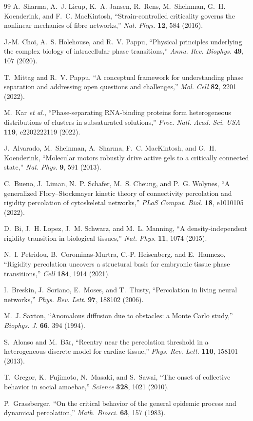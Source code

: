 \documentclass[11pt]{article}
\begin{document}
\begin{thebibliography}{99}
 A.~Sharma, A.~J. Licup, K.~A. Jansen, R.~Rens, M.~Sheinman, G.~H. Koenderink, and F.~C. MacKintosh, ``Strain-controlled criticality governs the nonlinear mechanics of fibre networks,'' \emph{Nat. Phys.} \textbf{12}, 584 (2016).

 J.-M. Choi, A.~S. Holehouse, and R.~V. Pappu, ``Physical principles underlying the complex biology of intracellular phase transitions,'' \emph{Annu. Rev. Biophys.} \textbf{49}, 107 (2020).

 T.~Mittag and R.~V. Pappu, ``A conceptual framework for understanding phase separation and addressing open questions and challenges,'' \emph{Mol. Cell} \textbf{82}, 2201 (2022).

 M.~Kar \emph{et al.}, ``Phase-separating RNA-binding proteins form heterogeneous distributions of clusters in subsaturated solutions,'' \emph{Proc. Natl. Acad. Sci. USA} \textbf{119}, e2202222119 (2022).

 J.~Alvarado, M.~Sheinman, A.~Sharma, F.~C. MacKintosh, and G.~H. Koenderink, ``Molecular motors robustly drive active gels to a critically connected state,'' \emph{Nat. Phys.} \textbf{9}, 591 (2013).

 C.~Bueno, J.~Liman, N.~P. Schafer, M.~S. Cheung, and P.~G. Wolynes, ``A generalized Flory--Stockmayer kinetic theory of connectivity percolation and rigidity percolation of cytoskeletal networks,'' \emph{PLoS Comput. Biol.} \textbf{18}, e1010105 (2022).

 D.~Bi, J.~H. Lopez, J.~M. Schwarz, and M.~L. Manning, ``A density-independent rigidity transition in biological tissues,'' \emph{Nat. Phys.} \textbf{11}, 1074 (2015).

 N.~I. Petridou, B.~Corominas-Murtra, C.-P. Heisenberg, and E.~Hannezo, ``Rigidity percolation uncovers a structural basis for embryonic tissue phase transitions,'' \emph{Cell} \textbf{184}, 1914 (2021).

 I.~Breskin, J.~Soriano, E.~Moses, and T.~Tlusty, ``Percolation in living neural networks,'' \emph{Phys. Rev. Lett.} \textbf{97}, 188102 (2006).

 M.~J. Saxton, ``Anomalous diffusion due to obstacles: a Monte Carlo study,'' \emph{Biophys. J.} \textbf{66}, 394 (1994).

 S.~Alonso and M.~B\"ar, ``Reentry near the percolation threshold in a heterogeneous discrete model for cardiac tissue,'' \emph{Phys. Rev. Lett.} \textbf{110}, 158101 (2013).

 T.~Gregor, K.~Fujimoto, N.~Masaki, and S.~Sawai, ``The onset of collective behavior in social amoebae,'' \emph{Science} \textbf{328}, 1021 (2010).

 P.~Grassberger, ``On the critical behavior of the general epidemic process and dynamical percolation,'' \emph{Math. Biosci.} \textbf{63}, 157 (1983).

\end{thebibliography}
\end{document}

